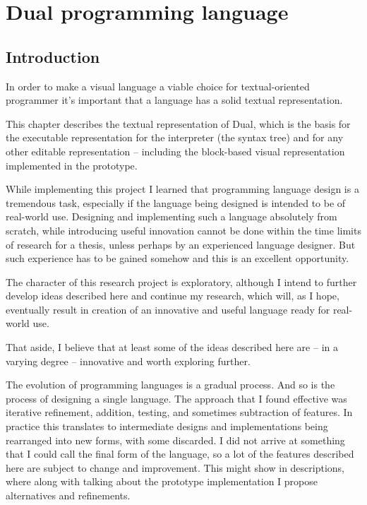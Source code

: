 \chapter{Dual programming language}\label{chap:lang}

\section{Introduction}
In order to make a visual language a viable choice for textual-oriented
programmer it's important that a language has a solid textual representation.

This chapter describes the textual representation of Dual, which is the basis
for the executable representation for the interpreter (the syntax tree) and for
any other editable representation -- including the block-based visual
representation implemented in the prototype.


While implementing this project I learned that programming language design is a
tremendous task, especially if the language being designed is intended to be of
real-world use. Designing and implementing such a language absolutely from
scratch, while introducing useful innovation cannot be done within the time
limits of research for a thesis, unless perhaps by an experienced language
designer. But such experience has to be gained somehow and this is an excellent
opportunity.

The character of this research project is exploratory, although I intend to
further develop ideas described here and continue my research, which will, as I
hope, eventually result in creation of an innovative and useful language ready
for real-world use.

That aside, I believe that at least some of the ideas described here are -- in a
varying degree -- innovative and worth exploring further.


The evolution of programming languages is a gradual process. And so is the
process of designing a single language. The approach that I found effective was
iterative refinement, addition, testing, and sometimes subtraction of
features. In practice this translates to intermediate designs and
implementations being rearranged into new forms, with some discarded. I did not
arrive at something that I could call the final form of the language, so a lot
of the features described here are subject to change and improvement. This might
show in descriptions, where along with talking about the prototype
implementation I propose alternatives and refinements.

